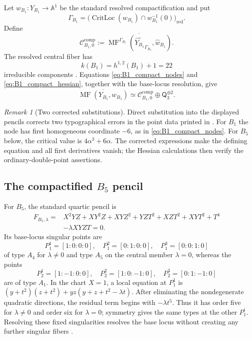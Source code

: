 \documentclass[11pt]{amsart}
\theoremstyle{definition}
\theoremstyle{remark}
\newtheorem{remark}[theorem]{Remark}
\DeclareMathOperator{\MF}{MF}
\DeclareMathOperator{\CritLoc}{CritLoc}
\newcommand{\MorseCat}[1]{\mathsf{Q}_{#1}}
\newcommand{\CcompBone}{\mathcal C^{\mathrm{comp}}_{B_1,0}}
\begin{document}
Let $w_{B_1}:Y_{B_1}\to\mathbb A^1$ be the standard resolved
compactification and put
\[
\Gamma_{B_1}
=\bigl(\CritLoc(w_{B_1})\cap w_{B_1}^{-1}(0)\bigr)_{\mathrm{red}}.
\]
Define
\begin{equation}
\label{eq:B1_compact_central_category}
\CcompBone
:=
\overline{\MF^{\Gamma_{B_1}}
(\widehat{Y_{B_1}}_{\Gamma_{B_1}},\widehat w_{B_1})}.
\end{equation}
The resolved central fiber has
\begin{equation}
\label{eq:B1_component_count}
k(B_1)=h^{1,2}(B_1)+1=22
\end{equation}
irreducible components \cite{PrzyjalkowskiHodge}.  Equations
\eqref{eq:B1_compact_nodes} and \eqref{eq:B1_compact_hessian}, together with
the base-locus resolution, give
\begin{equation}
\label{eq:B1_compact_final_decomposition}
\overline{\MF(Y_{B_1},w_{B_1})}
\simeq
\CcompBone\oplus\MorseCat{3}^{\oplus2}.
\end{equation}

\begin{remark}[Two corrected substitutions]
\label{rem:corrected_B1_B5_data}
Direct substitution into the displayed pencils corrects two typographical
errors in the point data printed in \cite{Przyjalkowski2026}.  For $B_1$ the
node has first homogeneous coordinate $-6$, as in
\eqref{eq:B1_compact_nodes}.  For $B_5$ below, the critical value is
$4\alpha^3+6\alpha$.  The corrected expressions make the defining equation
and all first derivatives vanish; the Hessian calculations then verify the
ordinary-double-point assertions.
\end{remark}

\subsection{The compactified \texorpdfstring{$B_5$}{B5} pencil}

For $B_5$, the standard quartic pencil is
\begin{equation}
\label{eq:B5_compact_pencil}
\begin{aligned}
F_{B_5,\lambda}={}&
X^2YZ+XY^2Z+XYZ^2+YZT^2+XZT^2+XYT^2+T^4\\
&-\lambda XYZT=0.
\end{aligned}
\end{equation}
Its base-locus singular points are
\[
P_1^1=[1:0:0:0],\quad
P_1^2=[0:1:0:0],\quad
P_1^3=[0:0:1:0]
\]
of type $A_4$ for $\lambda\neq0$ and type $A_5$ on the central member
$\lambda=0$, whereas the points
\[
P_2^1=[1:-1:0:0],\quad
P_2^2=[1:0:-1:0],\quad
P_2^3=[0:1:-1:0]
\]
are of type $A_1$.  In the chart $X=1$, a local equation at $P_1^1$ is
$(y+t^2)(z+t^2)+yz(y+z+t^2-\lambda t)$.  After eliminating the
nondegenerate quadratic directions, the residual term begins with
$-\lambda t^5$.  Thus it has order five for $\lambda\neq0$ and order six
for $\lambda=0$; symmetry gives the same types at the other $P_1^i$.
Resolving these fixed singularities resolves the base
locus without creating any further singular fibers
\cite{Przyjalkowski2026}.
\end{document}
